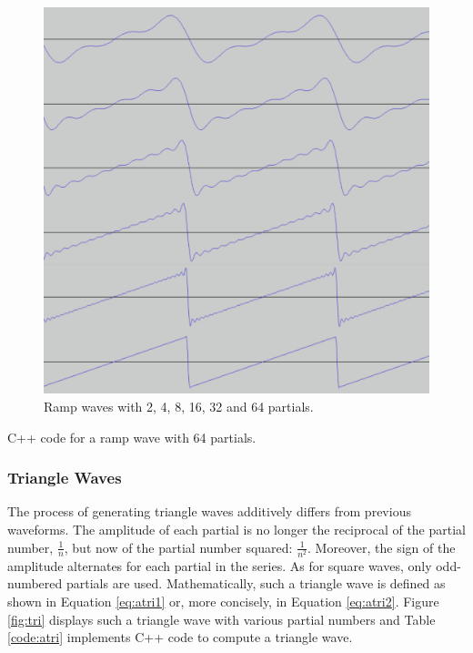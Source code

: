 \begin{figure}
  \includegraphics[scale=0.2]{img/ramp}
  \caption{Ramp waves with 2, 4, 8, 16, 32 and 64 partials.}
  \label{fig:ramp}
\end{figure}

\begin{table}
  \caption{C++ code for a ramp wave with 64 partials.}
  \label{code:aramp}
\end{table}

\pagebreak

\subsubsection{Triangle Waves}

The process of generating triangle waves additively differs from previous waveforms. The amplitude of each partial is no longer the reciprocal of the partial number, $\frac{1}{n}$, but now of the partial number squared: $\frac{1}{n^2}$. Moreover, the sign of the amplitude alternates for each partial in the series. As for square waves, only odd-numbered partials are used. Mathematically, such a triangle wave is defined as shown in Equation \ref{eq:atri1} or, more concisely, in Equation \ref{eq:atri2}. Figure \ref{fig:tri} displays such a triangle wave with various partial numbers and Table \ref{code:atri} implements C++ code to compute a triangle wave.

